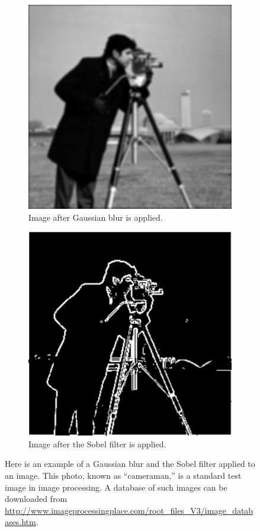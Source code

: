 \begin{figure}
\begin{subfigure}[b]{.49\textwidth}
\includegraphics[width=\textwidth]{cameramanBlur.pdf}
\caption{Image after Gaussian blur is applied.}
\label{fig:cameraman_blur}
\end{subfigure}
\begin{subfigure}[b]{.49\textwidth}
\centering
\includegraphics[width=\textwidth]{edges.pdf}
\caption{Image after the Sobel filter is applied.}
\label{fig:cameraman_edges}
\end{subfigure}
\caption{Here is an example of a Gaussian blur and the Sobel filter applied to an image.
This photo, known as ``cameraman,'' is a standard test image in image processing.
A database of such images can be downloaded from \url{http://www.imageprocessingplace.com/root_files_V3/image_databases.htm}.}
\label{fig:cameraman1}
\end{figure}

